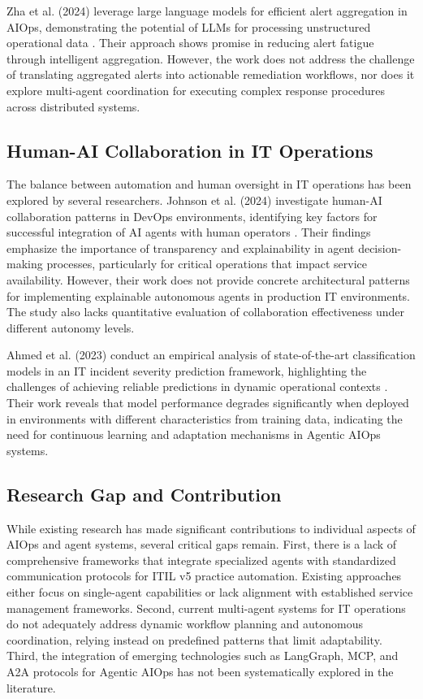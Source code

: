 \documentclass{article}
\begin{document}
Zha et al. (2024) leverage large language models for efficient alert aggregation in AIOps, demonstrating the potential of LLMs for processing unstructured operational data \cite{zha2024}. Their approach shows promise in reducing alert fatigue through intelligent aggregation. However, the work does not address the challenge of translating aggregated alerts into actionable remediation workflows, nor does it explore multi-agent coordination for executing complex response procedures across distributed systems.

\subsection{Human-AI Collaboration in IT Operations}

The balance between automation and human oversight in IT operations has been explored by several researchers. Johnson et al. (2024) investigate human-AI collaboration patterns in DevOps environments, identifying key factors for successful integration of AI agents with human operators \cite{johnson2024}. Their findings emphasize the importance of transparency and explainability in agent decision-making processes, particularly for critical operations that impact service availability. However, their work does not provide concrete architectural patterns for implementing explainable autonomous agents in production IT environments. The study also lacks quantitative evaluation of collaboration effectiveness under different autonomy levels.

Ahmed et al. (2023) conduct an empirical analysis of state-of-the-art classification models in an IT incident severity prediction framework, highlighting the challenges of achieving reliable predictions in dynamic operational contexts \cite{ahmed2023}. Their work reveals that model performance degrades significantly when deployed in environments with different characteristics from training data, indicating the need for continuous learning and adaptation mechanisms in Agentic AIOps systems.

\subsection{Research Gap and Contribution}

While existing research has made significant contributions to individual aspects of AIOps and agent systems, several critical gaps remain. First, there is a lack of comprehensive frameworks that integrate specialized agents with standardized communication protocols for ITIL v5 practice automation. Existing approaches either focus on single-agent capabilities or lack alignment with established service management frameworks. Second, current multi-agent systems for IT operations do not adequately address dynamic workflow planning and autonomous coordination, relying instead on predefined patterns that limit adaptability. Third, the integration of emerging technologies such as LangGraph, MCP, and A2A protocols for Agentic AIOps has not been systematically explored in the literature.
\end{document}
